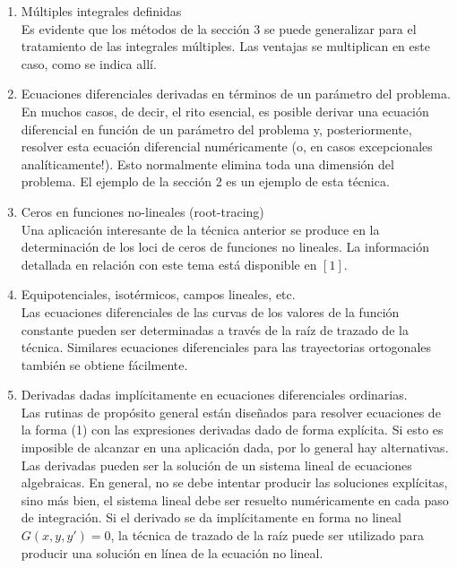 \begin{enumerate}
	\item Múltiples integrales definidas\\
		Es evidente que los métodos de la sección 3 se puede generalizar para el
		tratamiento de las integrales múltiples. Las ventajas se multiplican en este caso,
		como se indica allí.

	\item Ecuaciones diferenciales derivadas en términos de un parámetro del
problema.\\
		En muchos casos, de decir, el rito esencial, es posible derivar una ecuación diferencial
		en función de un parámetro del problema y, posteriormente, resolver esta ecuación
		diferencial numéricamente (o, en casos excepcionales analíticamente!).
		Esto normalmente elimina toda una dimensión del problema.
		El ejemplo de la sección 2 es un ejemplo de esta técnica.		

	\item Ceros en funciones no-lineales (root-tracing) \\
		Una aplicación interesante de la técnica anterior se produce en la determinación de los loci
		de ceros de funciones no lineales.
		La información detallada en relación con este tema está disponible en $ [1] $.

	\item Equipotenciales, isotérmicos, campos lineales, etc.\\
		Las ecuaciones diferenciales de las curvas de los valores de la
		función constante pueden ser determinadas a través de la raíz de
		trazado de la técnica. Similares ecuaciones diferenciales
		para las trayectorias ortogonales también se obtiene fácilmente.

	\item  Derivadas dadas implícitamente en ecuaciones diferenciales
ordinarias.\\
		Las rutinas de propósito general están diseñados para resolver ecuaciones de la forma (1) con las
		expresiones derivadas dado de forma explícita. Si esto es imposible de alcanzar en una aplicación
		dada, por lo general hay alternativas. Las derivadas pueden ser la solución de un sistema lineal
		de ecuaciones algebraicas. En general, no se debe intentar producir las soluciones explícitas,
		sino más bien, el sistema lineal debe ser resuelto numéricamente en cada paso de integración.
		Si el derivado se da implícitamente en forma no lineal $G(x,y,y') = 0$, la técnica de trazado
		de la raíz puede ser utilizado para producir una solución en línea de la ecuación no lineal.


\end{enumerate}
